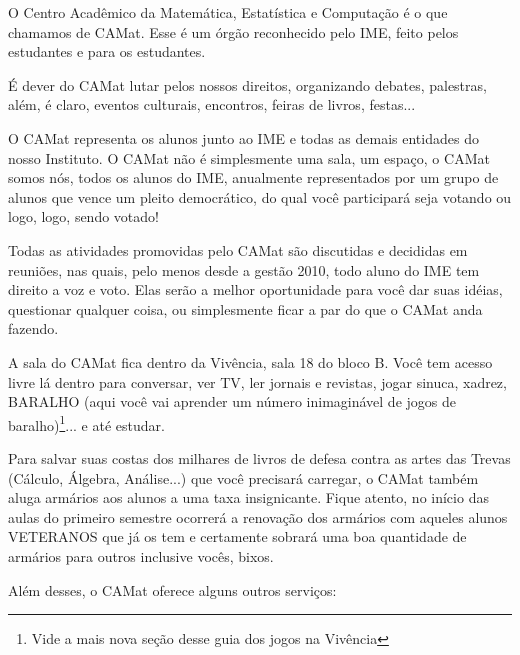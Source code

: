 \documentclass[11pt]{report}
\newenvironment{secao}[1] {
    \framebox[\textwidth] {
        \rule[-1.2ex]{5ex}{5.5ex}
        {\Large\sf #1}
        \hspace{\stretch{1}}
    } \addcontentsline{toc}{chapter}{#1}
    \nopagebreak[4]
} { 
}
\begin{document}
\begin{secao}{O CAMat}

O Centro Acadêmico da Matemática, Estatística e Computação é o que chamamos de CAMat. Esse é um órgão reconhecido pelo IME, feito pelos estudantes e para os estudantes.
 
É dever do CAMat lutar pelos nossos direitos, organizando debates, palestras, além, é claro, eventos culturais, encontros, feiras de livros, festas...
 
O CAMat representa os alunos junto ao IME e todas as demais entidades do nosso Instituto. O CAMat não é simplesmente uma sala, um espaço, o CAMat somos nós, todos os alunos do IME, anualmente representados por um grupo de alunos que vence um pleito democrático, do qual você participará seja votando ou logo, logo, sendo votado!

Todas as atividades promovidas pelo CAMat são discutidas e decididas em reuniões, nas quais, pelo menos desde a gestão 2010, todo aluno do IME tem direito a voz e voto. Elas serão a melhor oportunidade para você dar suas idéias, questionar qualquer coisa,
ou simplesmente ficar a par do que o CAMat anda fazendo. 
 
A sala do CAMat  fica dentro da Vivência, sala 18 do bloco B. Você tem acesso livre lá
dentro para conversar, ver TV, ler jornais e revistas, jogar sinuca, xadrez, BARALHO
(aqui você vai aprender um número inimaginável de jogos de baralho)\footnote{Vide a mais nova seção desse guia dos jogos na Vivência}... e até estudar.
 

Para salvar suas costas dos milhares de livros de defesa contra as artes das Trevas
(Cálculo, Álgebra, Análise...) que você precisará carregar, o CAMat também aluga
armários aos alunos a uma taxa insignicante. Fique atento, no início das aulas do primeiro semestre ocorrerá a renovação dos armários com aqueles alunos VETERANOS que já os tem e certamente sobrará uma boa quantidade de armários para outros inclusive vocês, bixos.
 
Além desses, o CAMat oferece alguns outros serviços:


\end{secao}
\end{document}
